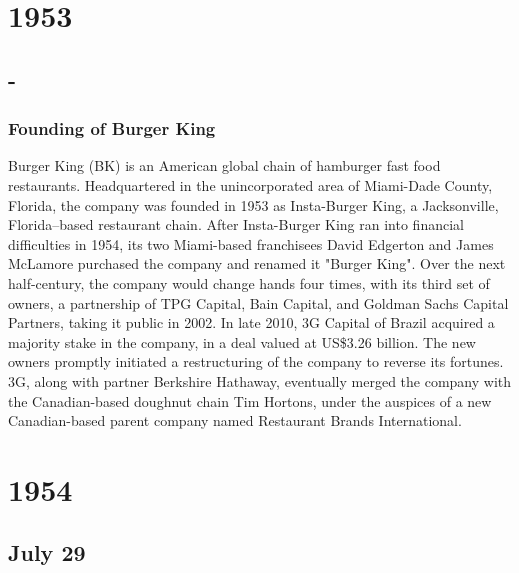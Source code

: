 \documentclass[11pt]{report}
\begin{document}
\chapter{1953}
\section{-}
\subsection{Founding of Burger King}
Burger King (BK) is an American global chain of hamburger fast food restaurants. Headquartered in the unincorporated area of Miami-Dade County, Florida, the company was founded in 1953 as Insta-Burger King, a Jacksonville, Florida–based restaurant chain. After Insta-Burger King ran into financial difficulties in 1954, its two Miami-based franchisees David Edgerton and James McLamore purchased the company and renamed it "Burger King". Over the next half-century, the company would change hands four times, with its third set of owners, a partnership of TPG Capital, Bain Capital, and Goldman Sachs Capital Partners, taking it public in 2002. In late 2010, 3G Capital of Brazil acquired a majority stake in the company, in a deal valued at US\$3.26 billion. The new owners promptly initiated a restructuring of the company to reverse its fortunes. 3G, along with partner Berkshire Hathaway, eventually merged the company with the Canadian-based doughnut chain Tim Hortons, under the auspices of a new Canadian-based parent company named Restaurant Brands International.

\chapter{1954}
\section{July 29}
\end{document}

